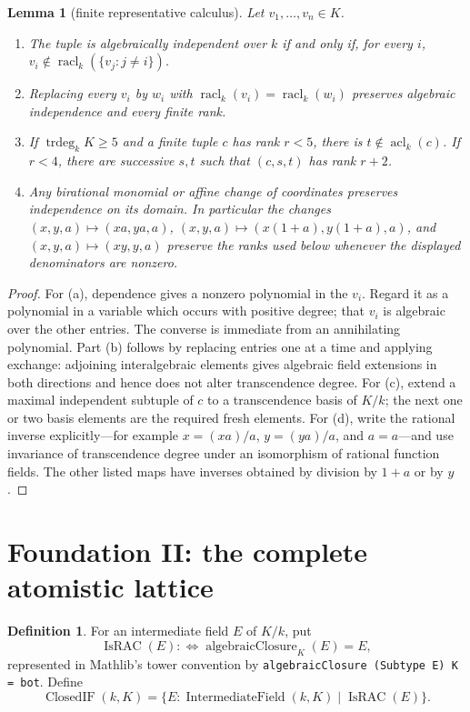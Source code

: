 \documentclass[11pt,oneside]{article}
\newtheorem{lemma}[theorem]{Lemma}
\theoremstyle{definition}
\newtheorem{definition}[theorem]{Definition}
\theoremstyle{remark}
\newcommand{\acl}{\operatorname{acl}}
\newcommand{\trdeg}{\operatorname{trdeg}}
\newcommand{\lean}[1]{\nolinkurl{#1}}
\begin{document}
\begin{lemma}[finite representative calculus]\label{lem:finite-representative-calculus}
Let $v_1,\ldots,v_n\in K$.
\begin{enumerate}[label=(\alph*),leftmargin=10mm]
\item The tuple is algebraically independent over $k$ if and only if, for every $i$,
$v_i\notin\operatorname{racl}_k(\{v_j:j\neq i\})$.
\item Replacing every $v_i$ by $w_i$ with
$\operatorname{racl}_k(v_i)=\operatorname{racl}_k(w_i)$ preserves algebraic
independence and every finite rank.
\item If $\trdeg_kK\geq5$ and a finite tuple $c$ has rank $r<5$, there is
$t\notin\acl_k(c)$.  If $r<4$, there are successive $s,t$ such that $(c,s,t)$ has
rank $r+2$.
\item Any birational monomial or affine change of coordinates preserves independence
on its domain.  In particular the changes
$(x,y,a)\mapsto(xa,ya,a)$,
$(x,y,a)\mapsto(x(1+a),y(1+a),a)$, and
$(x,y,a)\mapsto(xy,y,a)$ preserve the ranks used below whenever the displayed
denominators are nonzero.
\end{enumerate}
\end{lemma}
\begin{proof}
For (a), dependence gives a nonzero polynomial in the $v_i$.  Regard it as a polynomial
in a variable which occurs with positive degree; that $v_i$ is algebraic over the other
entries.  The converse is immediate from an annihilating polynomial.  Part (b) follows
by replacing entries one at a time and applying exchange: adjoining interalgebraic
elements gives algebraic field extensions in both directions and hence does not alter
transcendence degree.  For (c), extend a maximal independent subtuple of $c$ to a
transcendence basis of $K/k$; the next one or two basis elements are the required fresh
elements.  For (d), write the rational inverse explicitly---for example
$x=(xa)/a$, $y=(ya)/a$, and $a=a$---and use invariance of transcendence degree under
an isomorphism of rational function fields.  The other listed maps have inverses obtained
by division by $1+a$ or by $y$.
\end{proof}

\section{Foundation II: the complete atomistic lattice}

\begin{definition}
For an intermediate field $E$ of $K/k$, put
\[
  \operatorname{IsRAC}(E):\Longleftrightarrow
  \operatorname{algebraicClosure}_{K}(E)=E,
\]
represented in Mathlib's tower convention by
\lean{algebraicClosure (Subtype E) K = bot}.  Define
\[
  \operatorname{ClosedIF}(k,K)=\{E:\operatorname{IntermediateField}(k,K)\mid
  \operatorname{IsRAC}(E)\}.
\]
\end{definition}
\end{document}
